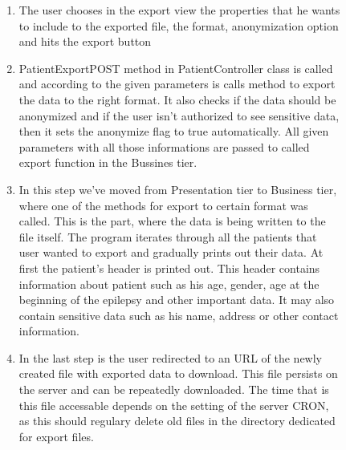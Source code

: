 \documentclass[thesis=B,english]{FITthesis}[2012/10/20]
\begin{document}
\begin{figure}[ht]\centering
\begin{enumerate}
\item{ The user chooses in the export view the properties that he wants to include to the exported file, the format, anonymization option and hits the export button }
\item{ PatientExportPOST method in PatientController class is called and according to the given parameters is calls method to export the data to the right format. It also checks if the data should be anonymized and if the user isn't authorized to see sensitive data, then it sets the anonymize flag to true automatically. All given parameters with all those informations are passed to called export function in the Bussines tier.}
\item{ In this step we've moved from Presentation tier to Business tier, where one of the methods for export to certain format was called. This is the part, where the data is being written to the file itself. The program iterates through all the patients that user wanted to export and gradually prints out their data.}
At first the patient's header is printed out. This header contains information about patient such as his age, gender, age at the beginning of the epilepsy and other important data. It may also contain sensitive data such as his name, address or other contact information.
\item{ In the last step is the user redirected to an URL of the newly created file with exported data to download. This file persists on the server and can be repeatedly downloaded. The time that is this file accessable depends on the setting of the server CRON, as this should regulary delete old files in the directory dedicated for export files.}

\end{enumerate}
\end{figure}
\end{document}
